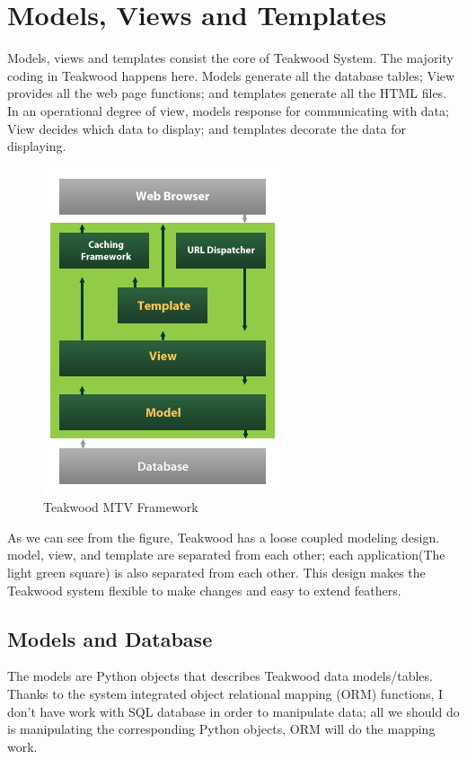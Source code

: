 \chapter{Models, Views and Templates}

Models, views and templates consist the core of Teakwood System. The majority coding in Teakwood happens here. Models generate all the database tables; View provides all the web page functions; and templates generate all the HTML files. In an operational degree of view, models response for communicating with data; View decides which data to display; and templates decorate the data for displaying.

\begin{figure}[htb]
\centering
\includegraphics[scale=0.7]{./mtv}
\caption{Teakwood MTV Framework}
\label{fig:label} %
\end{figure}

As we can see from the figure, Teakwood has a loose coupled modeling design. model, view, and template are separated from each other; each application(The light green square) is also separated from each other. This design makes the Teakwood system flexible to make changes and easy to extend feathers.

\section{Models and Database}

The models are Python objects that describes Teakwood data models/tables. Thanks to the system integrated object relational mapping (ORM) functions, I don't have work with SQL database in order to manipulate data; all we should do is manipulating the corresponding Python objects, ORM will do the mapping work.\\

